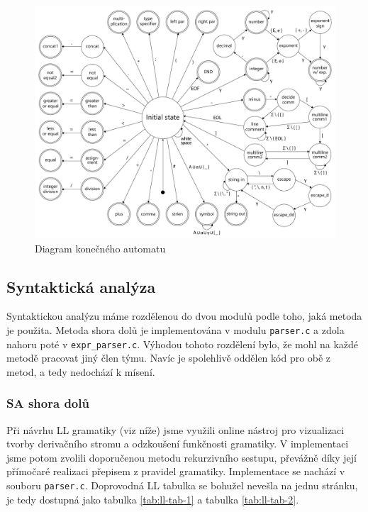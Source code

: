 \documentclass[11pt,a4paper]{article}
\begin{document}
        \begin{figure}[H]
        \includegraphics[width=\linewidth]{images/FSM_v12.pdf}
        \caption{Diagram konečného automatu}
        \label{fig:fsm-diagram}
        \end{figure}
    \subsection{Syntaktická analýza}
    Syntaktickou analýzu máme rozdělenou do dvou modulů podle toho, jaká metoda je použita. Metoda shora dolů je implementována v modulu \texttt{parser.c} a zdola nahoru poté v \texttt{expr\_parser.c}. Výhodou tohoto rozdělení bylo, že mohl na každé metodě pracovat jiný člen týmu. Navíc je spolehlivě oddělen kód pro obě z metod, a tedy nedochází k mísení.
    
        \subsubsection{SA shora dolů}
        Při návrhu LL gramatiky (viz níže) jsme využili online nástroj\cite{LL-grammar-simulator} pro  vizualizaci tvorby derivačního stromu a odzkoušení funkčnosti gramatiky. V implementaci jsme potom zvolili doporučenou metodu rekurzivního sestupu, převážně díky její přímočaré realizaci přepisem z pravidel gramatiky. Implementace se nachází v souboru \texttt{parser.c}. Doprovodná LL tabulka se bohužel nevešla na jednu stránku, je tedy dostupná jako tabulka \ref{tab:ll-tab-1} a tabulka \ref{tab:ll-tab-2}.\\
        
\end{document}
